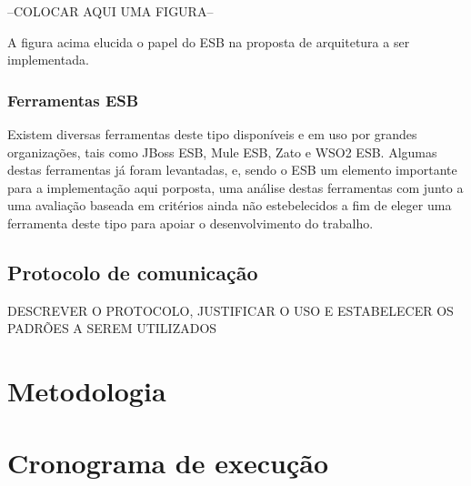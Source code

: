 --COLOCAR AQUI UMA FIGURA--

A figura acima elucida o papel do ESB na proposta de arquitetura a ser implementada.

\subsubsection{Ferramentas ESB}
Existem diversas ferramentas deste tipo disponíveis e em uso por grandes organizações, tais como JBoss ESB, Mule ESB, Zato e WSO2 ESB. Algumas destas ferramentas já foram levantadas, e, sendo o ESB um elemento importante para a implementação aqui porposta, uma análise destas ferramentas com junto a uma avaliação baseada em critérios ainda não estebelecidos a fim de eleger uma ferramenta deste tipo para apoiar o desenvolvimento do trabalho.

\subsection{Protocolo de comunicação}

{DESCREVER O PROTOCOLO, JUSTIFICAR O USO E ESTABELECER OS PADRÕES A SEREM UTILIZADOS}

\section{Metodologia}


\section{Cronograma de execução}
